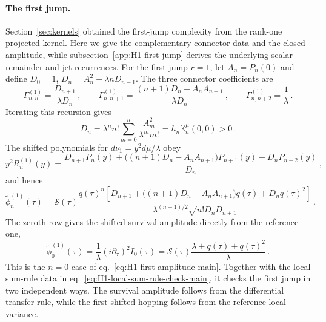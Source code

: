 \documentclass[a4paper,11pt]{article}
\def\dd{d}%
\def\ii{i}%
\theoremstyle{definition}
\theoremstyle{remark}
\newcommand{\dd}{\mathrm d}
\newcommand{\ii}{\mathrm i}
\newcommand{\tphi}{\widetilde\phi}
\newcommand{\cS}{\mathcal S}
\begin{document}
\paragraph{The first jump.}
Section~\ref{sec:kernels} obtained the first-jump complexity from the rank-one projected kernel. Here we give the complementary connector data and the closed amplitude, while subsection~\ref{app:H1-first-jump} derives the underlying scalar remainder and jet recurrences. 
For the first jump $r=1$, let $A_n=P_n(0)$ and define $D_0=1$, $D_n=A_n^2+\lambda nD_{n-1}$. The three connector coefficients are
\begin{equation}
   \Gamma_{n,n}^{(1)}=\frac{D_{n+1}}{\lambda D_n}\,,\qquad
   \Gamma_{n,n+1}^{(1)}=\frac{(n+1)D_n-A_nA_{n+1}}{\lambda D_n}\,,\qquad
   \Gamma_{n,n+2}^{(1)}=\frac{1}{\lambda}\,.
   \label{eq:H1-first-Gamma-main}
\end{equation}
Iterating this recursion gives
\begin{equation}
   D_n=\lambda^n n!\sum_{m=0}^{n}\frac{A_m^2}{\lambda^m m!}
   =h_n\mathbb K_n^{\mu}(0,0)>0\,.
   \label{eq:Dn-main}
\end{equation}
The shifted polynomials for $\dd\nu_1=y^2\dd\mu/\lambda$ obey
\begin{equation}
   y^2R_n^{(1)}(y)=
   \frac{D_{n+1}P_n(y)+\bigl((n+1)D_n-A_nA_{n+1}\bigr)P_{n+1}(y)+D_nP_{n+2}(y)}{D_n}\,,
   \label{eq:H1-first-polys-main}
\end{equation}
and hence
\begin{equation}
   \tphi_n^{(1)}(\tau)=\cS(\tau)
   \frac{q(\tau)^n\left[D_{n+1}+\bigl((n+1)D_n-A_nA_{n+1}\bigr)q(\tau)+D_nq(\tau)^2\right]}{\lambda^{(n+1)/2}\sqrt{n!D_nD_{n+1}}}\,.
   \label{eq:H1-first-amplitude-main}
\end{equation}
The zeroth row gives the shifted survival amplitude directly from the reference one, 
\begin{equation}
   \tphi_0^{(1)}(\tau)
   =\frac{1}{\lambda}(\ii\partial_\tau)^2I_0(\tau)
   =\cS(\tau)\frac{\lambda+q(\tau)+q(\tau)^2}{\lambda}\,.
   \label{eq:H1-survival-speed-check-main}
\end{equation}
This is the \(n=0\) case of eq.~\eqref{eq:H1-first-amplitude-main}. Together with the local sum-rule data in eq.~\eqref{eq:H1-local-sum-rule-check-main}, it checks the first jump in two independent ways. The survival amplitude follows from the differential transfer rule, while the first shifted hopping follows from the reference local variance.
\end{document}
